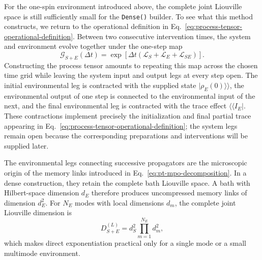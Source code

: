 For the one-spin environment introduced above, the complete joint Liouville space is still sufficiently small for the \texttt{Dense()} builder.
To see what this method constructs, we return to the operational definition in Eq.~\eqref{eq:process-tensor-operational-definition}.
Between two consecutive intervention times, the system and environment evolve together under the one-step map
%
\begin{equation}
    \mathcal G_{S+E}(\Delta t)
    = \exp \left[ \Delta t \left( \mathcal L_S
    + \mathcal L_E
    + \mathcal L_{SE} \right) \right].
    \label{eq:complete-system-environment-step}
\end{equation}
%
Constructing the process tensor amounts to repeating this map across the chosen time grid while leaving the system input and output legs at every step open.
The initial environmental leg is contracted with the supplied state \(\lvert\rho_E(0)\rangle\!\rangle\), the environmental output of one step is connected to the environmental input of the next, and the final environmental leg is contracted with the trace effect \(\langle\!\langle I_E\rvert\).
These contractions implement precisely the initialization and final partial trace appearing in Eq.~\eqref{eq:process-tensor-operational-definition}; the system legs remain open because the corresponding preparations and interventions will be supplied later.

The environmental legs connecting successive propagators are the microscopic origin of the memory links introduced in Eq.~\eqref{eq:pt-mpo-decomposition}.
In a dense construction, they retain the complete bath Liouville space.
A bath with Hilbert-space dimension \(d_E\) therefore produces uncompressed memory links of dimension \(d_E^2\).
For \(N_E\) modes with local dimensions \(d_m\), the complete joint Liouville dimension is
%
\begin{equation}
    D_{S+E}^{(L)}
    = d_S^2 \prod_{m=1}^{N_E}d_m^2,
    \label{eq:dense-joint-liouville-dimension}
\end{equation}
%
which makes direct exponentiation practical only for a single mode or a small multimode environment.

